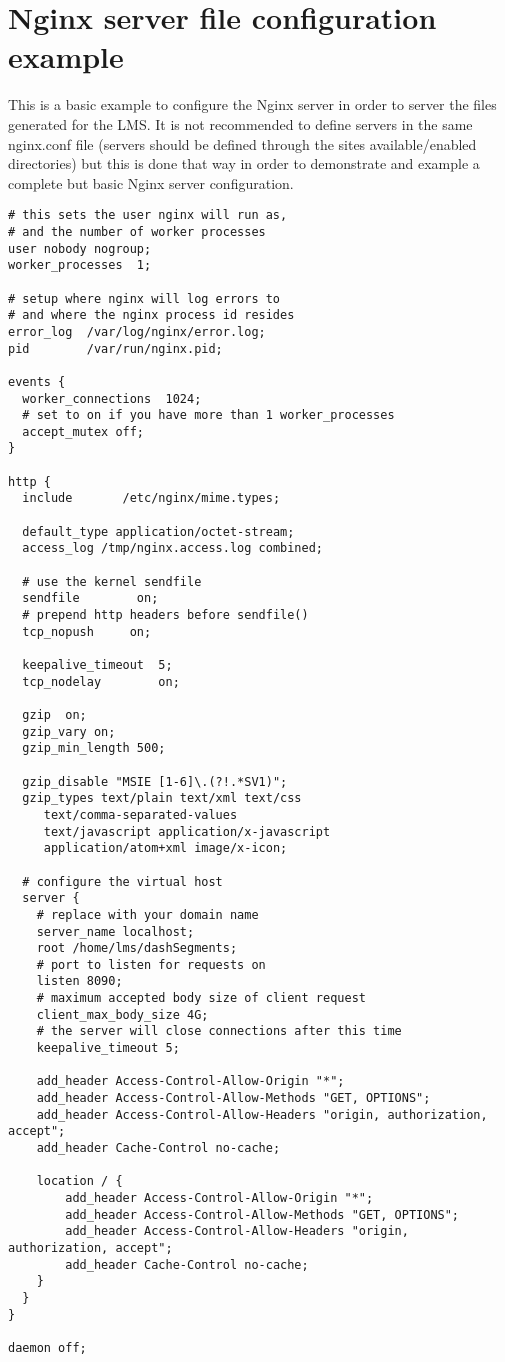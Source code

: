 \section{Nginx server file configuration example}\label{ANX:nginxexample}

This is a basic example to configure the Nginx server in order to server the files generated for the LMS. It is not recommended to define servers in the same nginx.conf file (servers should be defined through the sites available/enabled directories) but this is done that way in order to demonstrate and example a complete but basic Nginx server configuration.

\begin{verbatim}
# this sets the user nginx will run as, 
# and the number of worker processes
user nobody nogroup;
worker_processes  1;

# setup where nginx will log errors to 
# and where the nginx process id resides
error_log  /var/log/nginx/error.log;
pid        /var/run/nginx.pid;

events {
  worker_connections  1024;
  # set to on if you have more than 1 worker_processes 
  accept_mutex off;
}

http {
  include       /etc/nginx/mime.types;

  default_type application/octet-stream;
  access_log /tmp/nginx.access.log combined;
 
  # use the kernel sendfile
  sendfile        on;
  # prepend http headers before sendfile() 
  tcp_nopush     on;

  keepalive_timeout  5;
  tcp_nodelay        on;

  gzip  on;
  gzip_vary on;
  gzip_min_length 500;
  
  gzip_disable "MSIE [1-6]\.(?!.*SV1)";
  gzip_types text/plain text/xml text/css
     text/comma-separated-values
     text/javascript application/x-javascript
     application/atom+xml image/x-icon;

  # configure the virtual host
  server {
    # replace with your domain name
    server_name localhost;
    root /home/lms/dashSegments;
    # port to listen for requests on
    listen 8090;
    # maximum accepted body size of client request 
    client_max_body_size 4G;
    # the server will close connections after this time 
    keepalive_timeout 5;
    
    add_header Access-Control-Allow-Origin "*";
    add_header Access-Control-Allow-Methods "GET, OPTIONS";
    add_header Access-Control-Allow-Headers "origin, authorization, accept";
    add_header Cache-Control no-cache;
    
    location / {
        add_header Access-Control-Allow-Origin "*";
        add_header Access-Control-Allow-Methods "GET, OPTIONS";
        add_header Access-Control-Allow-Headers "origin, authorization, accept";
        add_header Cache-Control no-cache;
    }
  }
}

daemon off;
\end{verbatim}

